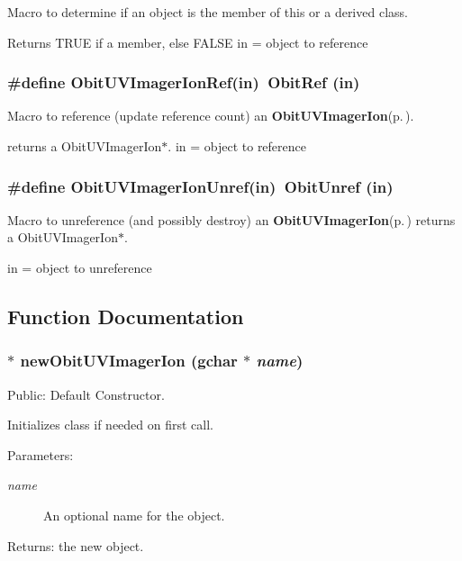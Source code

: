 Macro to determine if an object is the member of this or a derived class. 

Returns TRUE if a member, else FALSE in = object to reference 
\subsubsection{\setlength{\rightskip}{0pt plus 5cm}\#define Obit\-UVImager\-Ion\-Ref(in)\ Obit\-Ref (in)}\label{ObitUVImagerIon_8h_a1}


Macro to reference (update reference count) an {\bf Obit\-UVImager\-Ion}{\rm (p.\,\pageref{structObitUVImagerIon})}. 

returns a Obit\-UVImager\-Ion$\ast$. in = object to reference 
\subsubsection{\setlength{\rightskip}{0pt plus 5cm}\#define Obit\-UVImager\-Ion\-Unref(in)\ Obit\-Unref (in)}\label{ObitUVImagerIon_8h_a0}


Macro to unreference (and possibly destroy) an {\bf Obit\-UVImager\-Ion}{\rm (p.\,\pageref{structObitUVImagerIon})} returns a Obit\-UVImager\-Ion$\ast$. 

in = object to unreference 

\subsection{Function Documentation}
\subsubsection{$\ast$ new\-Obit\-UVImager\-Ion (gchar $\ast$ {\em name})}\label{ObitUVImagerIon_8h_a4}


Public: Default Constructor. 

Initializes class if needed on first call. \begin{Desc}
\item[Parameters:]
\begin{description}
\item[{\em name}]An optional name for the object. \end{description}
\end{Desc}
\begin{Desc}
\item[Returns:]the new object. \end{Desc}
